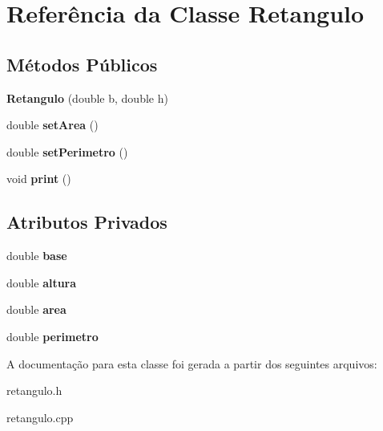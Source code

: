 \hypertarget{classRetangulo}{}\section{Referência da Classe Retangulo}
\label{classRetangulo}
\subsection*{Métodos Públicos}
\begin{DoxyCompactItemize}
\item 
{\bfseries Retangulo} (double b, double h)\hypertarget{classRetangulo_a98a0b9faa2ae67d85f3b180eb0457351}{}\label{classRetangulo_a98a0b9faa2ae67d85f3b180eb0457351}

\item 
double {\bfseries set\+Area} ()\hypertarget{classRetangulo_a3298c9e14454af2d641ca0c794e7046d}{}\label{classRetangulo_a3298c9e14454af2d641ca0c794e7046d}

\item 
double {\bfseries set\+Perimetro} ()\hypertarget{classRetangulo_abd65bcbc2370652cbf8ce7b090bfb6cb}{}\label{classRetangulo_abd65bcbc2370652cbf8ce7b090bfb6cb}

\item 
void {\bfseries print} ()\hypertarget{classRetangulo_a9bfaa1a8af68597677ee425f35b1e4e9}{}\label{classRetangulo_a9bfaa1a8af68597677ee425f35b1e4e9}

\end{DoxyCompactItemize}
\subsection*{Atributos Privados}
\begin{DoxyCompactItemize}
\item 
double {\bfseries base}\hypertarget{classRetangulo_a67b7abf7d68aa4fb6c4ee741f94f3fbb}{}\label{classRetangulo_a67b7abf7d68aa4fb6c4ee741f94f3fbb}

\item 
double {\bfseries altura}\hypertarget{classRetangulo_aea2e33f108cefa939014bfb638781189}{}\label{classRetangulo_aea2e33f108cefa939014bfb638781189}

\item 
double {\bfseries area}\hypertarget{classRetangulo_a8cfd7903de19b01c199e3ccce8e38d97}{}\label{classRetangulo_a8cfd7903de19b01c199e3ccce8e38d97}

\item 
double {\bfseries perimetro}\hypertarget{classRetangulo_a269b7898e5c45b135351fbcee4cb2efc}{}\label{classRetangulo_a269b7898e5c45b135351fbcee4cb2efc}

\end{DoxyCompactItemize}


A documentação para esta classe foi gerada a partir dos seguintes arquivos\+:\begin{DoxyCompactItemize}
\item 
retangulo.\+h\item 
retangulo.\+cpp\end{DoxyCompactItemize}
